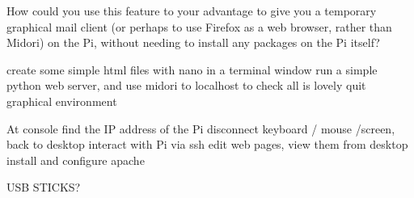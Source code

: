 How could you use this feature to your advantage to give you a temporary graphical mail client (or perhaps to use Firefox as a web browser, rather than Midori) on the Pi, without needing to install any packages on the Pi itself?





create some simple html files with nano in a terminal window
run a simple python web server, and use midori to localhost to check all is lovely
quit graphical environment

At console
find the IP address of the Pi
disconnect keyboard / mouse /screen, back to desktop
interact with Pi via ssh
edit web pages, view them from desktop
install and configure apache

USB STICKS?

